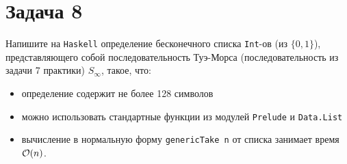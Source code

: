\section{Задача 8}
Напишите на \texttt{Haskell} определение бесконечного списка
\texttt{Int}-ов (из $\{ 0, 1 \}$), представляющего собой последовательность
Туэ-Морса (последовательность из задачи 7 практики) $S_\infty$, такое, что:
\begin{itemize}
\item определение содержит не более 128 символов
\item можно использовать стандартные функции из модулей \texttt{Prelude} и \texttt{Data.List}
\item вычисление в нормальную форму \texttt{genericTake n} от списка занимает время $\mathcal{O}(n)$.
\end{itemize}
